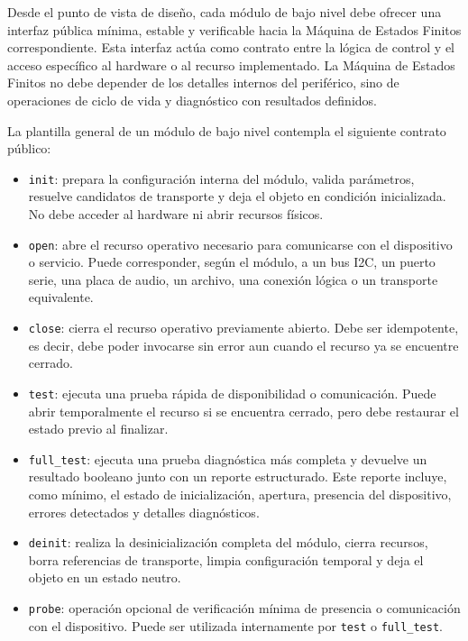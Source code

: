 Desde el punto de vista de diseño, cada módulo de bajo nivel debe ofrecer una interfaz pública mínima, estable y verificable hacia la Máquina de Estados Finitos correspondiente. Esta interfaz actúa como contrato entre la lógica de control y el acceso específico al hardware o al recurso implementado. La Máquina de Estados Finitos no debe depender de los detalles internos del periférico, sino de operaciones de ciclo de vida y diagnóstico con resultados definidos.

La plantilla general de un módulo de bajo nivel contempla el siguiente contrato público:

\begin{itemize}
    \item \texttt{init}: prepara la configuración interna del módulo, valida parámetros, resuelve candidatos de transporte y deja el objeto en condición inicializada. No debe acceder al hardware ni abrir recursos físicos.

    \item \texttt{open}: abre el recurso operativo necesario para comunicarse con el dispositivo o servicio. Puede corresponder, según el módulo, a un bus I2C, un puerto serie, una placa de audio, un archivo, una conexión lógica o un transporte equivalente.

    \item \texttt{close}: cierra el recurso operativo previamente abierto. Debe ser idempotente, es decir, debe poder invocarse sin error aun cuando el recurso ya se encuentre cerrado.

    \item \texttt{test}: ejecuta una prueba rápida de disponibilidad o comunicación. Puede abrir temporalmente el recurso si se encuentra cerrado, pero debe restaurar el estado previo al finalizar.

    \item \texttt{full\_test}: ejecuta una prueba diagnóstica más completa y devuelve un resultado booleano junto con un reporte estructurado. Este reporte incluye, como mínimo, el estado de inicialización, apertura, presencia del dispositivo, errores detectados y detalles diagnósticos.

    \item \texttt{deinit}: realiza la desinicialización completa del módulo, cierra recursos, borra referencias de transporte, limpia configuración temporal y deja el objeto en un estado neutro.

    \item \texttt{probe}: operación opcional de verificación mínima de presencia o comunicación con el dispositivo. Puede ser utilizada internamente por \texttt{test} o \texttt{full\_test}.
\end{itemize}

